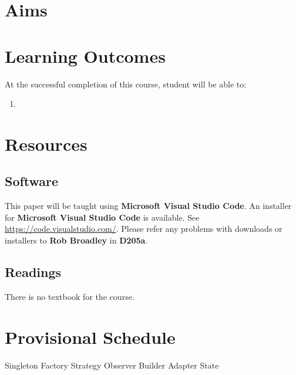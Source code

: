 \documentclass{article}
\begin{document}
\section*{Aims}

\section*{Learning Outcomes}
At the successful completion of this course, student will be able to:
\begin{enumerate}
	\item 
\end{enumerate}

\section*{Resources}

\subsection*{Software}
This paper will be taught using \textbf{Microsoft Visual Studio Code}. An installer for \textbf{Microsoft Visual Studio Code} is available. See \href{https://code.visualstudio.com/}{https://code.visualstudio.com/}. Please refer any problems with downloads or installers to \textbf{Rob Broadley} in \textbf{D205a}.

\subsection*{Readings}
There is no textbook for the course.

\section*{Provisional Schedule}

Singleton
Factory
Strategy
Observer
Builder
Adapter
State
\end{document}

